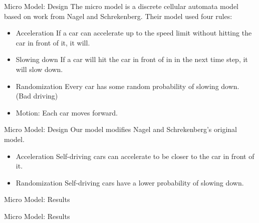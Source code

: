 \begin{frame}{Micro Model: Design}
The micro model is a discrete cellular automata model based on work from Nagel and Schrekenberg. Their model used four rules:
\begin{itemize}
\item \alert{Acceleration} If a car can accelerate up to the speed limit without hitting the car in front of it, it will.
\item \alert{Slowing down} If a car will hit the car in front of in in the next time step, it will slow down.
\item \alert{Randomization} Every car has some random probability of slowing down. (Bad driving)
\item \alert{Motion}: Each car moves forward.
\end{itemize}
\end{frame}

\begin{frame}{Micro Model: Design}
Our model modifies Nagel and Schrekenberg's original model.
\begin{itemize}
\item \alert{Acceleration} Self-driving cars can accelerate to be closer to the car in front of it.
\item \alert{Randomization} Self-driving cars have a lower probability of slowing down.
\end{itemize}
\end{frame}

\begin{frame}{Micro Model: Results}

\end{frame}

\begin{frame}{Micro Model: Results}

\end{frame}